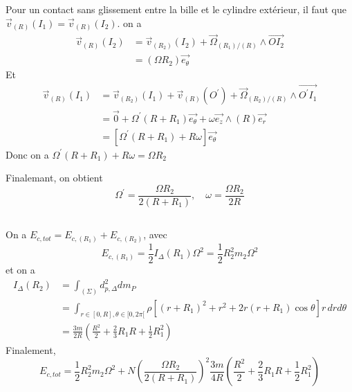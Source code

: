 \documentclass[a4paper,12pt]{book}
\begin{document}
Pour un contact sans glissement entre la bille et le cylindre extérieur, il faut que $\vec{v}_{(R)}(I_1)=\vec{v}_{(R)}(I_2)$. 
on a
\begin{align*}
\vec{v}_{(R)}(I_2)&=\vec{v}_{(R_2)}(I_2)+\vec{\Omega}_{(R_1)/(R)}\wedge \overrightarrow{OI_2}\\
&=(\Omega R_2)\vec{e_\theta}
\end{align*}
Et
\begin{align*}
    \vec{v}_{(R)}(I_1)&=\vec{v}_{(R_2)}(I_1)+\vec{v}_{(R)}(O^{'})+\vec{\Omega}_{(R_2)/(R)}\wedge \overrightarrow{O^{'}I_1}\\
    &=\vec{0}+\Omega^{'}(R+R_1)\vec{e_\theta}+\omega \vec{e_z}\wedge (R)\vec{e_r}\\
    &=[\Omega^{'}(R+R_1)+R\omega]\vec{e_\theta}
\end{align*}
Donc on a $\Omega^{'}(R+R_1)+R\omega=\Omega R_2$

Finalemant, on obtient 
$$\boxed{\Omega^{'}=\frac{\Omega R_2}{2(R+R_1)}, \quad \omega=\frac{\Omega R_2}{2R}}$$

\subsection{}
On a $E_{c,tot}=E_{c,(R_1)}+E_{c,(R_2)}$, avec
$$
E_{c,(R_1)}=\frac{1}{2}I_{\Delta}(R_1)\Omega^2=\frac{1}{2}R_2^2m_2\Omega^2
$$
et on a  
\begin{align*}
I_{\Delta}(R_2)&=\int_{(\Sigma)}d^2_{p,\Delta}dm_P\\
&=\int_{r \in [0,R], \theta \in [0,2\pi[}\rho [(r+R_1)^2+r^2+2r(r+R_1)\cos\theta]r\,drd\theta\\
&=\frac{3m}{2R}\left(\frac{R^2}{2}+\frac{2}{3}R_1R+\frac{1}{2}R_1^2\right)
\end{align*}
Finalement, 
$$
\boxed{E_{c,tot}=\frac{1}{2}R_2^2m_2\Omega^2+N\left(\frac{\Omega R_2}{2(R+R_1)}\right)^2\frac{3m}{4R}\left(\frac{R^2}{2}+\frac{2}{3}R_1R+\frac{1}{2}R_1^2\right)}
$$
\end{document}
